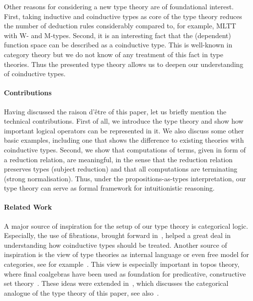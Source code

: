 \documentclass[preprint]{sigplanconf}
\begin{document}
Other reasons for considering a new type theory are of foundational interest.
First, taking inductive and coinductive types as core of
the type theory reduces the number of deduction rules considerably
compared to, for example, MLTT with W- and M-types.
Second, it is an interesting fact that the (dependent) function space can be
described as a coinductive type.
This is well-known in category theory but we do not know of any treatment of
this fact in type theories.
Thus the presented type theory allows us to deepen our understanding of
coinductive types.

\paragraph{Contributions}

Having discussed the raison d'être of this paper, let us briefly mention the
technical contributions.
First of all, we introduce the type theory and show how important logical
operators can be represented in it. We also discuss some other basic examples,
including one that shows the difference to existing theories with coinductive
types.
Second, we show that computations of terms, given in form of a reduction
relation, are meaningful, in the sense that the reduction relation preserves
types (subject reduction) and that all computations are terminating (strong
normalisation).
Thus, under the propositions-as-types interpretation, our type theory can
serve as formal framework for intuitionistic reasoning.



\paragraph{Related Work}
A major source of inspiration for the setup of our type theory is categorical
logic.
Especially, the use of fibrations, brought forward in~\cite{Jacobs1999-CLTT},
helped a great deal in understanding how coinductive types should be treated.
Another source of inspiration is the view of type theories as internal language
or even free model for categories, see for example~\cite{LambekScott-HOCatLog}.
This view is especially important in topos theory, where final coalgebras
have been used as foundation for predicative, constructive
set theory~\cite{Aczel:nonwfs,vdBerg-Non-wellfoundedTrees,vanDenBerg:thesis}.
These ideas were extended in~\cite{Basold-DepCoindFibDialg},
which discusses the categorical analogue of the type theory of this paper,
see also~.
\end{document}
